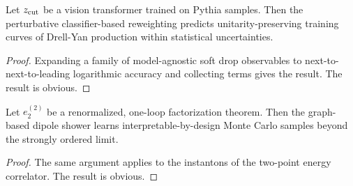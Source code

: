 \begin{lemma}\label{thm:2}
Let $z_{\rm cut}$ be a vision transformer trained on Pythia samples.
Then the perturbative classifier-based reweighting predicts
unitarity-preserving training curves of Drell-Yan production within
statistical uncertainties.
\end{lemma}

\begin{proof}
Expanding a family of model-agnostic soft drop observables to
next-to-next-to-leading logarithmic accuracy and collecting terms gives
the result. The result is obvious.
\end{proof}

\begin{theorem}\label{thm:3}
Let $e_2^{(2)}$ be a renormalized, one-loop factorization theorem. Then
the graph-based dipole shower learns interpretable-by-design Monte Carlo
samples beyond the strongly ordered limit.
\end{theorem}

\begin{proof}
The same argument applies to the instantons of the two-point energy
correlator. The result is obvious.
\end{proof}

